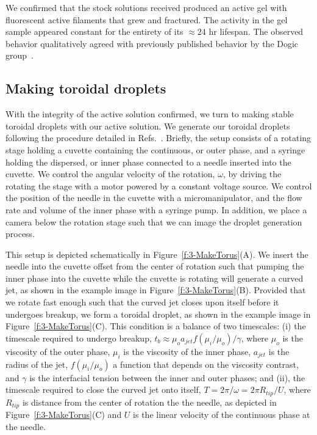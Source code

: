 We confirmed that the stock solutions received produced an active gel with fluorescent active filaments that grew and fractured.
The activity in the gel sample appeared constant for the entirety of its  $\approx 24$ hr lifespan.
The observed behavior qualitatively agreed with previously published behavior by the Dogic group~\cite{RN3}.


\subsection{Making toroidal droplets}
With the integrity of the active solution confirmed, we turn to making stable toroidal droplets with our active solution.
We generate our toroidal droplets following the procedure detailed in Refs.~\cite{RN29,RN47,RN257}.
Briefly, the setup consists of a rotating stage holding a cuvette containing the continuous, or outer phase, and a syringe holding the dispersed, or inner phase connected to a needle inserted into the cuvette.
We control the angular velocity of the rotation, $\omega$, by driving the rotating the stage with a motor powered by a constant voltage source.
We control the position of the needle in the cuvette with a micromanipulator, and the flow rate and volume of the inner phase with a syringe pump.
In addition, we place a camera below the rotation stage such that we can image the droplet generation process.

This setup is depicted schematically in Figure~\ref{f:3-MakeTorus}(A).
We insert the needle into the cuvette offset from the center of rotation such that pumping the inner phase into the cuvette while the cuvette is rotating will generate a curved jet, as shown in the example image in Figure~\ref{f:3-MakeTorus}(B).
Provided that we rotate fast enough such that the curved jet closes upon itself before it undergoes breakup, we form a toroidal droplet, as shown in the example image in Figure~\ref{f:3-MakeTorus}(C).
This condition is a balance of two timescales: (i) the timescale required to undergo breakup, $t_b \approx \mu_o a_{jet} f(\mu_i/\mu_o)/\gamma$, where $\mu_o$ is the viscosity of the outer phase, $\mu_i$ is the viscosity of the inner phase, $a_{jet}$ is the radius of the jet, $f(\mu_i/\mu_o)$ a function that depends on the viscosity contrast, and $\gamma$ is the interfacial tension between the inner and outer phases;
  and (ii), the timescale required to close the curved jet onto itself, $T = 2\pi/\omega = 2 \pi R_{tip}/U$, where $R_{tip}$ is distance from the center of rotation the the needle, as depicted in Figure~\ref{f:3-MakeTorus}(C) and $U$ is the linear velocity of the continuous phase at the needle.

